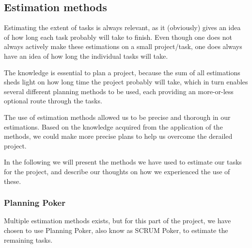 \subsection{Estimation methods}
Estimating the extent of tasks is always relevant, as it (obviously) gives an idea of how long each task probably will take to finish. Even though one does not always actively make these estimations on a small project/task, one does always have an idea of how long the individual tasks will take.

The knowledge is essential to plan a project, because the sum of all estimations sheds light on how long time the project probably will take, which in turn enables several different planning methods to be used, each providing an more-or-less optional route through the tasks.

The use of estimation methods allowed us to be precise and thorough in our estimations. Based on the knowledge acquired from the application of the methods, we could make more precise plans to help us overcome the derailed project.

In the following we will present the methods we have used to estimate our tasks for the project, and describe our thoughts on how we experienced the use of these.

\subsubsection{Planning Poker}
Multiple estimation methods exists, but for this part of the project, we have chosen to use Planning Poker, also know as SCRUM Poker, to estimate the remaining tasks.

